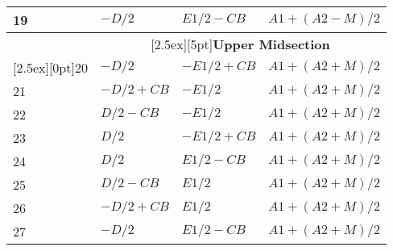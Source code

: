 \documentclass[a4paper]{article}
\begin{document}
\begin{longtable}{|l|l|l|l|}
19 & $-D/2$      & $E1/2-CB$           & $A1+(A2-M)/2$\\
\hline
&\multicolumn{3}{|c|}{\raisebox{0pt}[2.5ex][5pt]{\textbf{Upper Midsection}}}\\\cline{2-4}
\raisebox{0pt}[2.5ex][0pt]{20}
   & $-D/2$      & $-E1/2+CB$          & $A1+(A2+M)/2$\\
21 & $-D/2+CB$   & $-E1/2$             & $A1+(A2+M)/2$\\
22 & $D/2-CB$    & $-E1/2$             & $A1+(A2+M)/2$\\
23 & $D/2$       & $-E1/2+CB$          & $A1+(A2+M)/2$\\
24 & $D/2$       & $E1/2-CB$           & $A1+(A2+M)/2$\\
25 & $D/2-CB$    & $E1/2$              & $A1+(A2+M)/2$\\
26 & $-D/2+CB$   & $E1/2$              & $A1+(A2+M)/2$\\
27 & $-D/2$      & $E1/2-CB$           & $A1+(A2+M)/2$\\


\end{longtable}
\end{document}

